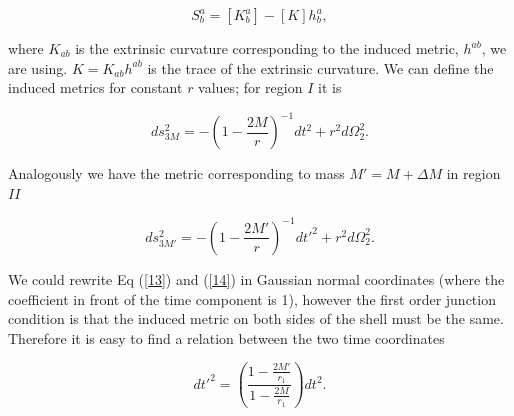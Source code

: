\documentclass[aps,showpacs,onecolumn,floats,prd,superscriptaddress,nofootinbib]{revtex4-1}
\begin{document}
%
%

\begin{equation}
	S^a_b = [K^a_b] - [K]h^a_b,
\end{equation}

where $K_{ab}$ is the extrinsic curvature corresponding to the induced metric, $h^{ab}$, we are using. $K = K_{ab} h^{ab}$ is the trace of the extrinsic curvature.
We can define the induced metrics for constant $r$ values; for region $I$ it is 

\begin{equation}
	ds_{3M}^2 = - \left( 1 - \frac{2M}{r} \right)^{-1} dt^2 + r^2 d \Omega_2^2.	\label{13}
\end{equation}

Analogously we have the metric corresponding to mass $M' = M+ \Delta M$ in region $II$

\begin{equation}
	ds_{3M'}^2 = - \left( 1 - \frac{2M'}{r} \right)^{-1} dt'^2 + r^2 d \Omega_2^2.	\label{14}
\end{equation}

We could rewrite Eq (\ref{13}) and (\ref{14}) in Gaussian normal coordinates (where the coefficient in front of the time component is 1), however the first order junction condition is that the induced metric on both sides of the shell must be the same. Therefore it is easy to find a relation between the two time coordinates

\begin{equation}
	dt'^2 = \left( \frac{1 - \frac{2M'}{r_1}}{ 1- \frac{2M}{r_1}} \right) dt^2.
\end{equation}
\end{document}
